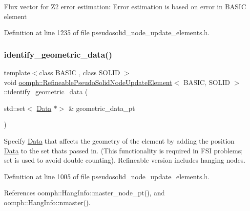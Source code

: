 \textquotesingle{}Flux\textquotesingle{} vector for Z2 error estimation\+: Error estimation is based on error in B\+A\+S\+IC element 

Definition at line 1235 of file pseudosolid\+\_\+node\+\_\+update\+\_\+elements.\+h.

\mbox{\label{classoomph_1_1RefineablePseudoSolidNodeUpdateElement_a7f5152a1ad0e86b439330f92b989bb2a}} 
\subsubsection{\texorpdfstring{identify\+\_\+geometric\+\_\+data()}{identify\_geometric\_data()}}
{\footnotesize\ttfamily template$<$class B\+A\+S\+IC , class S\+O\+L\+ID $>$ \\
void \hyperlink{classoomph_1_1RefineablePseudoSolidNodeUpdateElement}{oomph\+::\+Refineable\+Pseudo\+Solid\+Node\+Update\+Element}$<$ B\+A\+S\+IC, S\+O\+L\+ID $>$\+::identify\+\_\+geometric\+\_\+data (\begin{DoxyParamCaption}\item[{std\+::set$<$ \hyperlink{classoomph_1_1Data}{Data} $\ast$$>$ \&}]{geometric\+\_\+data\+\_\+pt }\end{DoxyParamCaption})\hspace{0.3cm}{\ttfamily [inline]}}



Specify \hyperlink{classoomph_1_1Data}{Data} that affects the geometry of the element by adding the position \hyperlink{classoomph_1_1Data}{Data} to the set that\textquotesingle{}s passed in. (This functionality is required in F\+SI problems; set is used to avoid double counting). Refineable version includes hanging nodes. 



Definition at line 1005 of file pseudosolid\+\_\+node\+\_\+update\+\_\+elements.\+h.



References oomph\+::\+Hang\+Info\+::master\+\_\+node\+\_\+pt(), and oomph\+::\+Hang\+Info\+::nmaster().

